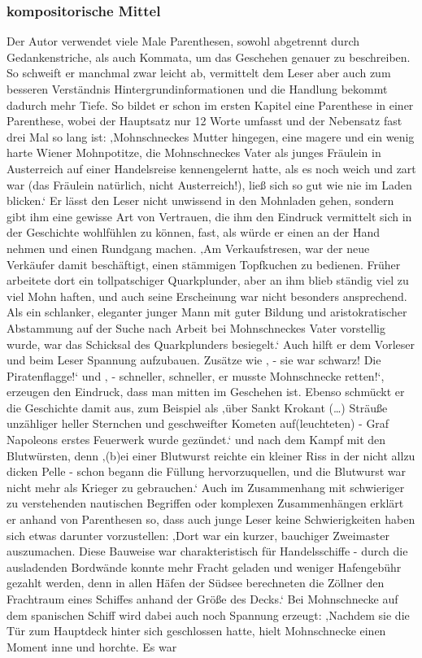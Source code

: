 {\subsubsection{kompositorische Mittel}

Der Autor verwendet viele Male Parenthesen, sowohl abgetrennt durch Gedankenstriche, als auch Kommata, um das Geschehen genauer zu beschreiben. So schweift er manchmal zwar leicht ab, vermittelt dem Leser aber auch zum besseren Verständnis Hintergrundinformationen und die Handlung bekommt dadurch mehr Tiefe. So bildet er schon im ersten Kapitel eine Parenthese in einer Parenthese, wobei der Hauptsatz nur 12 Worte umfasst und der Nebensatz fast drei Mal so lang ist:\cite[S.13]{pir} ‚Mohnschneckes Mutter hingegen, eine magere und ein wenig harte Wiener Mohnpotitze, die Mohnschneckes Vater als junges Fräulein in Austerreich  auf einer Handelsreise kennengelernt hatte, als es noch weich und zart war (das Fräulein natürlich, nicht Austerreich!), ließ sich so gut wie nie im Laden blicken.‘\cite[S.13]{pir} Er lässt  den Leser nicht unwissend in den Mohnladen gehen, sondern gibt ihm eine gewisse Art von Vertrauen, die ihm den Eindruck vermittelt sich in der Geschichte wohlfühlen zu können, fast, als würde er einen an der Hand nehmen und einen Rundgang machen. ‚Am Verkaufstresen, war der neue Verkäufer damit beschäftigt, einen stämmigen Topfkuchen zu bedienen. Früher arbeitete dort ein tollpatschiger Quarkplunder, aber an ihm blieb ständig viel zu viel Mohn haften, und auch seine Erscheinung war nicht besonders ansprechend. Als ein schlanker, eleganter junger Mann mit guter Bildung und aristokratischer Abstammung auf der Suche nach Arbeit bei Mohnschneckes Vater vorstellig wurde, war das Schicksal des Quarkplunders besiegelt.‘\cite[S.15]{pir} Auch hilft er dem Vorleser und beim Leser Spannung aufzubauen. Zusätze wie ‚ - sie war schwarz! Die Piratenflagge!‘\cite[S.28]{pir} und ‚ - schneller, schneller, er musste Mohnschnecke retten!‘,\cite[S.29]{pir} erzeugen den Eindruck, dass man mitten im Geschehen ist. Ebenso schmückt er die Geschichte damit aus, zum Beispiel als ‚über Sankt Krokant (…) Sträuße unzähliger heller Sternchen und geschweifter Kometen auf(leuchteten) - Graf Napoleons erstes Feuerwerk wurde gezündet.‘\cite[S.36]{pir} und nach dem Kampf mit den Blutwürsten, denn ‚(b)ei einer Blutwurst reichte ein kleiner Riss in der nicht allzu dicken Pelle - schon begann die Füllung hervorzuquellen, und die Blutwurst war nicht mehr als Krieger zu gebrauchen.‘ Auch im Zusammenhang mit schwieriger zu verstehenden nautischen Begriffen oder komplexen Zusammenhängen erklärt er anhand von  Parenthesen so, dass auch junge Leser keine Schwierigkeiten haben sich etwas darunter vorzustellen: ‚Dort war ein kurzer, bauchiger Zweimaster auszumachen. Diese Bauweise war charakteristisch für Handelsschiffe - durch die ausladenden Bordwände konnte mehr Fracht geladen und weniger Hafengebühr gezahlt werden, denn in allen Häfen der Südsee berechneten die Zöllner den Frachtraum eines Schiffes anhand der Größe des Decks.‘\cite[S.51]{pir} Bei Mohnschnecke auf  dem spanischen Schiff wird dabei auch noch Spannung erzeugt: ‚Nachdem sie die Tür zum Hauptdeck hinter sich geschlossen hatte, hielt Mohnschnecke einen Moment inne und horchte. Es war }
